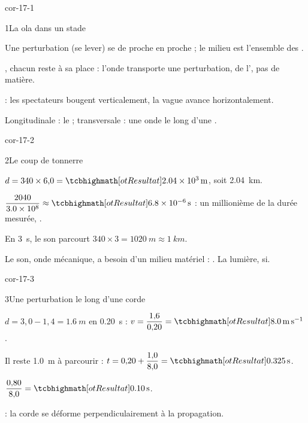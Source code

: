 \corrigesSouples

\begin{blocLivre}{cor-17-1}
\begin{corrige}{1}{La ola dans un stade}
\begin{questions}
\item Une perturbation (se lever) se  de proche en proche ; le milieu est l'ensemble des .
\item {}, chacun reste à sa place : l'onde transporte une perturbation, de l', pas de matière.
\item {} : les spectateurs bougent verticalement, la vague avance horizontalement.
\item Longitudinale : le  ; transversale : une onde le long d'une .
\end{questions}
\end{corrige}
\end{blocLivre}
\begin{blocLivre}{cor-17-2}
\begin{corrige}{2}{Le coup de tonnerre}
\begin{questions}
\item $d=340\times6{,}0=\res{\qty{2,04e3}{m}}$, soit \qty{2,04}{km}.
\item $\dfrac{2040}{\num{3,0e8}}\approx\res{\qty{6,8e-6}{s}}$ : un millionième de la durée mesurée, .
\item En \qty{3}{s}, le son parcourt $340\times3=\qty{1020}{m}\approx\qty{1}{km}$.
\item Le son, onde mécanique, a besoin d'un milieu matériel : . La lumière, si.
\end{questions}
\end{corrige}
\end{blocLivre}
\begin{blocLivre}{cor-17-3}
\begin{corrige}{3}{Une perturbation le long d'une corde}
\begin{questions}
\item $d=3{,}0-1{,}4=\qty{1,6}{m}$ en \qty{0,20}{s} : $v=\dfrac{1{,}6}{0{,}20}=\res{\qty{8,0}{m.s^{-1}}}$.
\item Il reste \qty{1,0}{m} à parcourir : $t=0{,}20+\dfrac{1{,}0}{8{,}0}=\res{\qty{0,325}{s}}$.
\item $\dfrac{0{,}80}{8{,}0}=\res{\qty{0,10}{s}}$.
\item {} : la corde se déforme perpendiculairement à la propagation.
\end{questions}
\end{corrige}
\end{blocLivre}
